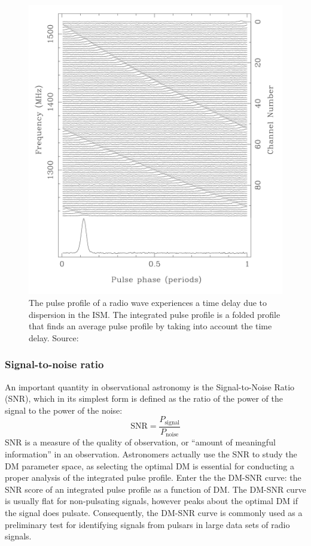 \documentclass[nofootinbib,reprint,english]{revtex4-1}
\begin{document}
\begin{figure}
\centering
\includegraphics[scale=0.2]{./Pulsar_dm.png}
\caption{The pulse profile of a radio wave experiences a time delay due to dispersion in the ISM. The integrated pulse profile is a folded profile that finds an average pulse profile by taking into account the time delay. Source: \cite{IntegratedPulseProfile}}\label{fig:integrated_pulse_profile}
\end{figure}

\subsubsection{Signal-to-noise ratio}
An important quantity in observational astronomy is the Signal-to-Noise Ratio (SNR), which in its simplest form is defined as the ratio of the power of the signal to the power of the noise:
\begin{equation}
\text{SNR}=\frac{P_\text{signal}}{P_\text{noise}}
\end{equation}
SNR is a measure of the quality of observation, or ``amount of meaningful information'' in an observation. Astronomers actually use the SNR to study the DM parameter space, as selecting the optimal DM is essential for conducting a proper analysis of the integrated pulse profile. Enter the the DM-SNR curve: the SNR score of an integrated pulse profile as a function of DM. The DM-SNR curve is usually flat for non-pulsating signals, however peaks about the optimal DM if the signal does pulsate. Consequently, the DM-SNR curve is commonly used as a preliminary test for identifying signals from pulsars in large data sets of radio signals.
\end{document}
